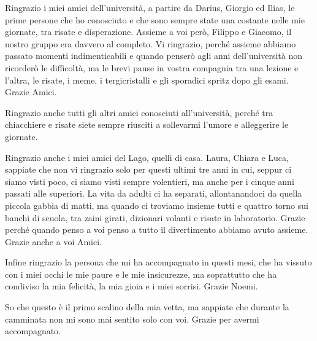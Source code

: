 \begin{dedication}
  \vspace{1.5cm}


  Ringrazio i miei amici dell'università, a partire da Darius, Giorgio ed Ilias, le prime persone che ho conosciuto e che sono sempre state una costante nelle mie giornate, tra risate e disperazione. Assieme a voi però, Filippo e Giacomo, il nostro gruppo era davvero al completo. Vi ringrazio, perché assieme abbiamo passato momenti indimenticabili e quando penserò agli anni dell'università non ricorderò le difficoltà, ma le brevi pause in vostra compagnia tra una lezione e l'altra, le risate, i meme, i tergicristalli e gli sporadici spritz dopo gli esami. Grazie Amici.

  Ringrazio anche tutti gli altri amici conosciuti all'università, perché tra chiacchiere e risate siete sempre riusciti a sollevarmi l'umore e alleggerire le giornate.

  Ringrazio anche i miei amici del Lago, quelli di casa. Laura, Chiara e Luca, sappiate che non vi ringrazio solo per questi ultimi tre anni in cui, seppur ci siamo visti poco, ci siamo visti sempre volentieri, ma anche per i cinque anni passati alle superiori. La vita da adulti ci ha separati, allontanandoci da quella piccola gabbia di matti, ma quando ci troviamo insieme tutti e quattro torno sui banchi di scuola, tra zaini girati, dizionari volanti e risate in laboratorio. Grazie perché quando penso a voi penso a tutto il divertimento abbiamo avuto assieme. Grazie anche a voi Amici.
  
  
  Infine ringrazio la persona che mi ha accompagnato in questi mesi, che ha vissuto con i miei occhi le mie paure e le mie insicurezze, ma soprattutto che ha condiviso la mia felicità, la mia gioia e i miei sorrisi. Grazie Noemi.
  
  \vspace{1.5cm}
  
  So che questo è il primo scalino della mia vetta, ma sappiate che durante la camminata non mi sono mai sentito solo con voi. Grazie per avermi accompagnato. 
\end{dedication}